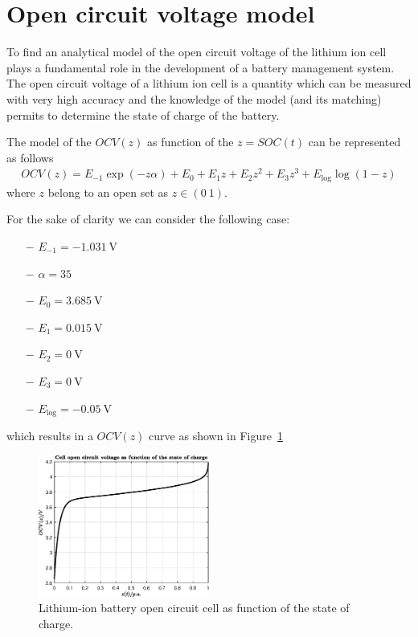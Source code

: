 \documentclass[11pt,a4paper]{article}
\numberwithin{equation}{section}
\theoremstyle{it}
\theoremstyle{definition}
\begin{document}
\section{Open circuit voltage model}
To find an analytical model of the open circuit voltage of the lithium ion cell plays a fundamental role in the development of a battery management system. The open circuit voltage of a lithium ion cell is a quantity which can be measured with very high accuracy and the knowledge of the model (and its matching) permits to determine the state of charge of the battery.

The model of the $OCV(z)$ as function of the $z=SOC(t)$ can be represented as follows
\begin{equation}
 	\begin{aligned}
		OCV(z) = E_{-1}\exp(-z\alpha) + E_0 + E_1z + E_2z^2 + E_3z^3 +  E_\text{log}\log({1-z})
	\end{aligned}
\end{equation}
where $z$ belong to an open set as $z\in\left(0\ 1\right)$.

For the sake of clarity we can consider the following case:
\begin{itemize}
	\item[$-$] $E_{-1}=\SI{-1.031}{\volt}$
	\item[$-$] $\alpha=\SI{35}{}$
	\item[$-$] $E_0=\SI{3.685}{\volt}$
	\item[$-$] $E_1=\SI{0.015}{\volt}$
	\item[$-$] $E_2=\SI{0}{\volt}$
	\item[$-$] $E_3=\SI{0}{\volt}$
	\item[$-$] $E_\text{log}=\SI{-0.05}{\volt}$
\end{itemize}
which results in a $OCV(z)$ curve as shown in Figure~\ref{ocv} 
\begin{figure}[H]
	\centering
	\includegraphics[width = 0.5\textwidth, width = 300pt, angle = 0, keepaspectratio]{figures/lithium_ion_battery/ocv.eps}
	\captionsetup{width=0.5\textwidth}		
	\caption{Lithium-ion battery open circuit cell as function of the state of charge.}
	\label{ocv}
\end{figure}
\end{document}

